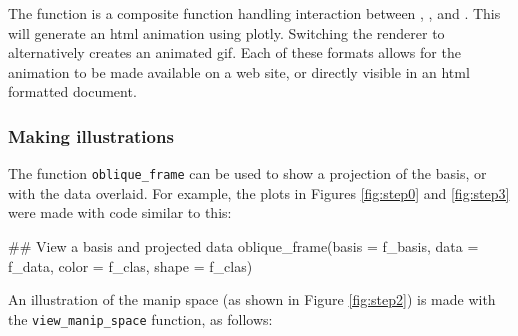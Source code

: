 \begin{Schunk}
\end{Schunk}

\noindent The  function is a composite
function handling interaction between ,
, and . This will generate an
html animation using plotly. Switching the renderer to
 alternatively creates an animated gif. Each
of these formats allows for the animation to be made available on a web
site, or directly visible in an html formatted document.

\hypertarget{making-illustrations}{%
\subsubsection{Making illustrations}\label{making-illustrations}}

The function \texttt{oblique\_frame} can be used to show a projection of
the basis, or with the data overlaid. For example, the plots in Figures
\ref{fig:step0} and \ref{fig:step3} were made with code similar to this:

\begin{Schunk}
\begin{Sinput}
## View a basis and projected data 
oblique_frame(basis = f_basis, 
              data = f_data,
              color = f_clas,
              shape = f_clas)
\end{Sinput}
\end{Schunk}

\noindent An illustration of the manip space (as shown in Figure
\ref{fig:step2}) is made with the \texttt{view\_manip\_space} function,
as follows:

